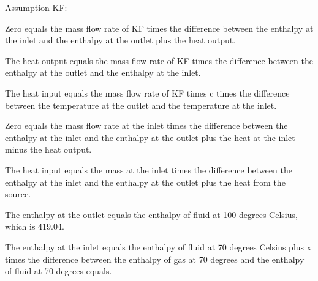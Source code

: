 Assumption KF:

Zero equals the mass flow rate of KF times the difference between the enthalpy at the inlet and the enthalpy at the outlet plus the heat output.

The heat output equals the mass flow rate of KF times the difference between the enthalpy at the outlet and the enthalpy at the inlet.

The heat input equals the mass flow rate of KF times c times the difference between the temperature at the outlet and the temperature at the inlet.

Zero equals the mass flow rate at the inlet times the difference between the enthalpy at the inlet and the enthalpy at the outlet plus the heat at the inlet minus the heat output.

The heat input equals the mass at the inlet times the difference between the enthalpy at the inlet and the enthalpy at the outlet plus the heat from the source.

The enthalpy at the outlet equals the enthalpy of fluid at 100 degrees Celsius, which is 419.04.

The enthalpy at the inlet equals the enthalpy of fluid at 70 degrees Celsius plus x times the difference between the enthalpy of gas at 70 degrees and the enthalpy of fluid at 70 degrees equals.